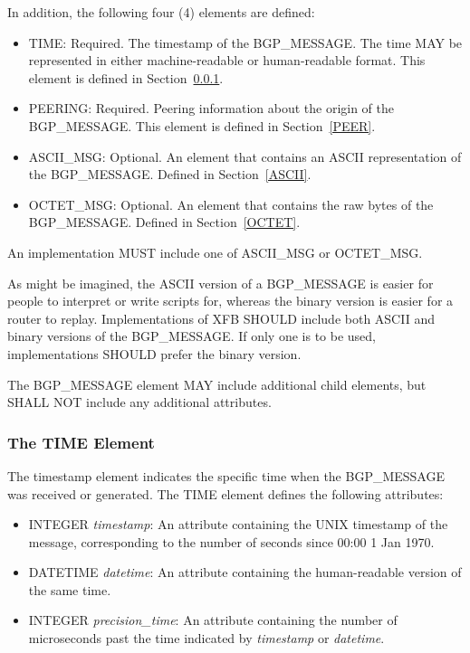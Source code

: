 \documentclass{article}
\begin{document}
In addition, the following four (4) elements are defined:

\begin{itemize}
\item{TIME: Required. The timestamp of the BGP_MESSAGE.  The time MAY be represented in either machine-readable or human-readable format.  This element is defined in Section~\ref{TIME}.}
\item{PEERING: Required. Peering information about the origin of the BGP_MESSAGE.  This element is defined in Section~\ref{PEER}.}
\item{ASCII_MSG: Optional. An element that contains an ASCII representation of the BGP_MESSAGE.  Defined in Section~\ref{ASCII}.}
\item{OCTET_MSG: Optional. An element that contains the raw bytes of the BGP_MESSAGE.  Defined in Section~\ref{OCTET}.}
\end{itemize}

An implementation MUST include one of ASCII_MSG or OCTET_MSG.

As might be imagined, the ASCII version of a BGP_MESSAGE is easier for people to interpret or write scripts for, whereas the binary version is easier for a router to replay.
Implementations of XFB SHOULD include both ASCII and binary versions of the BGP_MESSAGE.  If only one is to be used, implementations SHOULD prefer the binary version.

The BGP_MESSAGE element MAY include additional child elements, but SHALL NOT include any additional attributes.

\subsubsection{The TIME Element}
\label{TIME}
The timestamp element indicates the specific time when the BGP_MESSAGE was received or generated.  The TIME element defines the following attributes:

\begin{itemize}
\item{INTEGER \emph{timestamp}: An attribute containing the UNIX timestamp of the message, corresponding to the number of seconds since 00:00 1 Jan 1970.}
\item{DATETIME \emph{datetime}: An attribute containing the human-readable version of the same time.}
\item{INTEGER \emph{precision_time}:  An attribute containing the number of microseconds past the time indicated by \emph{timestamp} or \emph{datetime}.}
\end{itemize}
\end{document}

